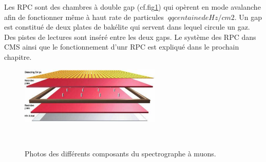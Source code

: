 \begin{itemize}[label=$\bullet$]
	Les RPC sont des chambres à double gap (cf.fig\ref{RPC2}) qui opèrent en mode avalanche afin de fonctionner même à haut rate de particules $~qq centaine de Hz/cm2$. Un gap est constitué de deux plates de bakélite qui servent  dans lequel circule un gaz. Des pistes de lectures sont inséré entre les deux gaps. Le système des RPC dans CMS ainsi que le fonctionnement d'unr RPC est expliqué dans le prochain chapitre.
	  \begin{figure}[ht!]
		\centering
		\includegraphics[width=0.60\textwidth]{CMS/RPC2.jpg}
		\label{RPC2}
	\end{figure}
	
	
\end{itemize}
    \begin{figure}[ht!]
	\centering
	\\
	\caption{Photos des différents composants du spectrographe à muons.}
\end{figure}

